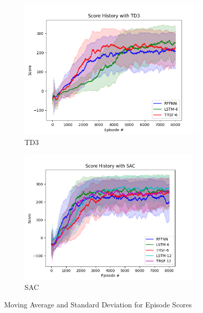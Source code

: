 \begin{figure}[!ht]
	\centering
	\begin{subfigure}{.49\textwidth}
		\centering
		\includegraphics[width=0.99\textwidth]{figures/bipedal/STD_TD3_RFFNN_LSTM-6_TRSF-6.png}
		\caption{TD3}
		\label{fig:td3_std_ep_rewards}
	\end{subfigure}
	\begin{subfigure}{.49\textwidth}
		\centering
		\includegraphics[width=0.95\textwidth]{figures/bipedal/STD_SAC_RFFNN_LSTM-6_TRSF-6_LSTM-12_TRSF-12.png}
		\caption{SAC}
		\label{fig:sac_std_ep_rewards}
	\end{subfigure}
	\caption{Moving Average and Standard Deviation for Episode Scores}
\end{figure}

